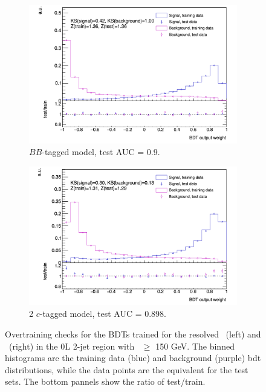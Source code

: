 \begin{figure}[h!]
  \hspace{-0.3cm}
  \begin{subfigure}[b]{0.49\textwidth}
      \centering
    \includegraphics[width=\textwidth]{Images/VH/Discriminants/0Lbb.png}
  \caption{$BB$-tagged model, test AUC = 0.9.} 
  \end{subfigure}
  \begin{subfigure}[b]{0.49\textwidth}
      \centering
    \includegraphics[width=\textwidth]{Images/VH/Discriminants/0Lcc.png}
    \caption{2 $c$-tagged model, test AUC = 0.898.}
  \end{subfigure}
  \caption{Overtraining checks for the BDTs trained for the resolved \vhb\ (left) and \vhc\ (right) in the 0L 2-jet region with \ptv\ $\geq$ 150 GeV. The binned histograms are the training data (blue) and background (purple) \gls{bdt} distributions, while the data points are the equivalent for the test sets. The bottom pannels show the ratio of test/train.}
  \label{fig:overtrainingCheck}
\end{figure}
\vspace*{\fill}
\newpage

